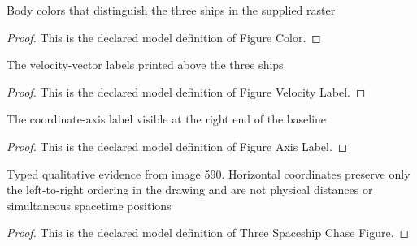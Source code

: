 \begin{definition}
  \label{def:physics:phyx-mini-0590:phyxminiproblems-problemphyxmini0590-figurecolor}
  Body colors that distinguish the three ships in the supplied raster
\end{definition}
\begin{proof}
  This is the declared model definition of Figure Color.
\end{proof}
\begin{definition}
  \label{def:physics:phyx-mini-0590:phyxminiproblems-problemphyxmini0590-figurevelocitylabel}
  The velocity-vector labels printed above the three ships
\end{definition}
\begin{proof}
  This is the declared model definition of Figure Velocity Label.
\end{proof}
\begin{definition}
  \label{def:physics:phyx-mini-0590:phyxminiproblems-problemphyxmini0590-figureaxislabel}
  The coordinate-axis label visible at the right end of the baseline
\end{definition}
\begin{proof}
  This is the declared model definition of Figure Axis Label.
\end{proof}
\begin{definition}
  \label{def:physics:phyx-mini-0590:phyxminiproblems-problemphyxmini0590-threespaceshipchasefigure}
  Typed qualitative evidence from image 590. Horizontal coordinates preserve only the left-to-right ordering in the drawing and are not physical distances or simultaneous spacetime positions
\end{definition}
\begin{proof}
  This is the declared model definition of Three Spaceship Chase Figure.
\end{proof}
